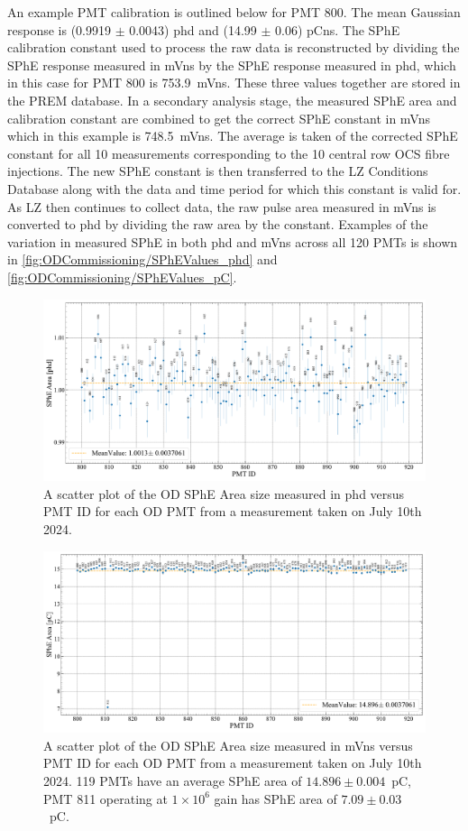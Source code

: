 An example PMT calibration is outlined below for PMT 800. The mean Gaussian response is (0.9919 $\pm$ 0.0043) phd and (14.99 $\pm$ 0.06) pCns. The SPhE calibration constant used to process the raw data is reconstructed by dividing the SPhE response measured in mVns by the SPhE response measured in phd, which in this case for PMT 800 is 753.9~mVns. These three values together are stored in the PREM database. In a secondary analysis stage, the measured SPhE area and calibration constant are combined to get the correct SPhE constant in mVns which in this example is 748.5~mVns. The average is taken of the corrected SPhE constant for all 10 measurements corresponding to the 10 central row OCS fibre injections. The new SPhE constant is then transferred to the LZ Conditions Database along with the data and time period for which this constant is valid for. As LZ then continues to collect data, the raw pulse area measured in mVns is converted to phd by dividing the raw area by the constant. Examples of the variation in measured SPhE in both phd and mVns across all 120 PMTs is shown in \autoref{fig:ODCommissioning/SPhEValues_phd} and \autoref{fig:ODCommissioning/SPhEValues_pC}.
\begin{figure}[ht!]
    \centering
    \includegraphics[width=\textwidth]{figures/ODCommissioning/SPHE_phd_2024-7-10.pdf}
    \caption{A scatter plot of the OD SPhE Area size measured in phd versus PMT ID for each OD PMT from a measurement taken on July 10th 2024.}
    \label{fig:ODCommissioning/SPhEValues_phd}
\end{figure}
\begin{figure}[ht!]
    \centering
    \includegraphics[width=\textwidth]{figures/ODCommissioning/SPHE_pC_2024-7-10.pdf}
    \caption{A scatter plot of the OD SPhE Area size measured in mVns versus PMT ID for each OD PMT from a measurement taken on July 10th 2024. 119 PMTs have an average SPhE area of $14.896\pm0.004$~pC, PMT 811 operating at $1\times10^6$ gain has SPhE area of $7.09\pm0.03$~pC.}
    \label{fig:ODCommissioning/SPhEValues_pC}
\end{figure}
